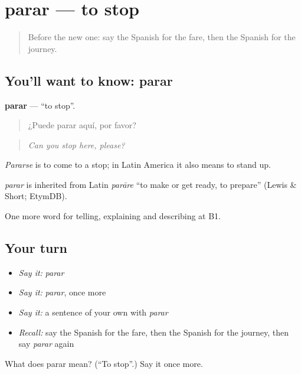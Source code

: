 \section[parar]{parar — to stop}

\label{lesson:ES-C641-parar}



\begin{quote}
Before the new one: say the Spanish for the fare, then the Spanish for the journey.
\end{quote}

\subsection*{You'll want to know: parar}
\textbf{parar} — \textquotedblleft{}to stop\textquotedblright{}.

\begin{quote}
¿Puede parar aquí, por favor?
\end{quote}

\begin{quote}
\emph{Can you stop here, please?}
\end{quote}

\emph{Pararse} is to come to a stop; in Latin America it also means to stand up.

\begin{cousinweb}
\emph{parar} is inherited from Latin \emph{parāre} \textquotedblleft{}to make or get ready, to prepare\textquotedblright{} (Lewis \& Short; EtymDB).
\end{cousinweb}

\begin{grammarlens}[title={What you've built}]
One more word for telling, explaining and describing at B1.
\end{grammarlens}

\subsection*{Your turn}
\begin{itemize}
\raggedright
  \item \emph{Say it:} \emph{parar}
  \item \emph{Say it:} \emph{parar}, once more
  \item \emph{Say it:} a sentence of your own with \emph{parar}
  \item \emph{Recall:} say the Spanish for the fare, then the Spanish for the journey, then say \emph{parar} again
\end{itemize}

\begin{tcolorbox}[breakable,colback=teal!4,colframe=teal!35!black,title={Before you move on}]
What does parar mean? (\textquotedblleft{}To stop\textquotedblright{}.) Say it once more.
\end{tcolorbox}
